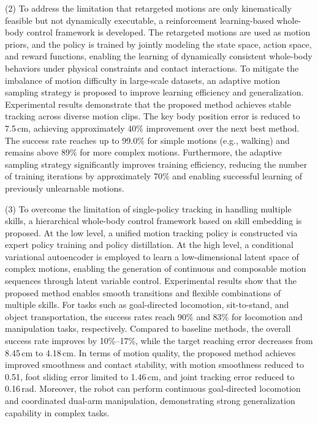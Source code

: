 \begin{eabstract}
	(2) To address the limitation that retargeted motions are only kinematically feasible but not dynamically executable, a reinforcement learning-based whole-body control framework is developed. The retargeted motions are used as motion priors, and the policy is trained by jointly modeling the state space, action space, and reward functions, enabling the learning of dynamically consistent whole-body behaviors under physical constraints and contact interactions. To mitigate the imbalance of motion difficulty in large-scale datasets, an adaptive motion sampling strategy is proposed to improve learning efficiency and generalization. Experimental results demonstrate that the proposed method achieves stable tracking across diverse motion clips. The key body position error is reduced to 7.5\,cm, achieving approximately 40\% improvement over the next best method. The success rate reaches up to 99.0\% for simple motions (e.g., walking) and remains above 89\% for more complex motions. Furthermore, the adaptive sampling strategy significantly improves training efficiency, reducing the number of training iterations by approximately 70\% and enabling successful learning of previously unlearnable motions.
	
	(3) To overcome the limitation of single-policy tracking in handling multiple skills, a hierarchical whole-body control framework based on skill embedding is proposed. At the low level, a unified motion tracking policy is constructed via expert policy training and policy distillation. At the high level, a conditional variational autoencoder is employed to learn a low-dimensional latent space of complex motions, enabling the generation of continuous and composable motion sequences through latent variable control. Experimental results show that the proposed method enables smooth transitions and flexible combinations of multiple skills. For tasks such as goal-directed locomotion, sit-to-stand, and object transportation, the success rates reach 90\% and 83\% for locomotion and manipulation tasks, respectively. Compared to baseline methods, the overall success rate improves by 10\%--17\%, while the target reaching error decreases from 8.45\,cm to 4.18\,cm. In terms of motion quality, the proposed method achieves improved smoothness and contact stability, with motion smoothness reduced to 0.51, foot sliding error limited to 1.46\,cm, and joint tracking error reduced to 0.16\,rad. Moreover, the robot can perform continuous goal-directed locomotion and coordinated dual-arm manipulation, demonstrating strong generalization capability in complex tasks.
	

\end{eabstract}
